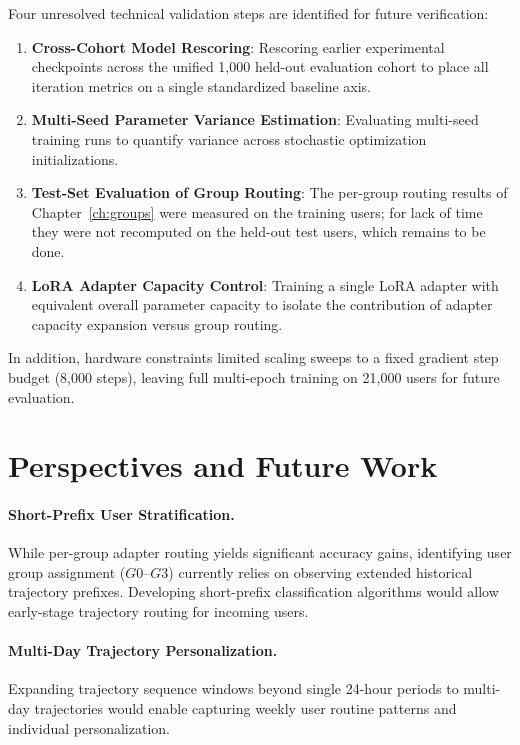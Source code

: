 Four unresolved technical validation steps are identified for future verification:
\begin{enumerate}
    \item \textbf{Cross-Cohort Model Rescoring}: Rescoring earlier experimental checkpoints across the unified 1,000 held-out evaluation cohort to place all iteration metrics on a single standardized baseline axis.
    \item \textbf{Multi-Seed Parameter Variance Estimation}: Evaluating multi-seed training runs to quantify variance across stochastic optimization initializations.
    \item \textbf{Test-Set Evaluation of Group Routing}: The per-group routing results of Chapter~\ref{ch:groups} were measured on the training users; for lack of time they were not recomputed on the held-out test users, which remains to be done.
    \item \textbf{LoRA Adapter Capacity Control}: Training a single LoRA adapter with equivalent overall parameter capacity to isolate the contribution of adapter capacity expansion versus group routing.
\end{enumerate}

In addition, hardware constraints limited scaling sweeps to a fixed gradient step budget (8,000 steps), leaving full multi-epoch training on 21,000 users for future evaluation.

\section{Perspectives and Future Work}

\paragraph{Short-Prefix User Stratification.} While per-group adapter routing yields significant accuracy gains, identifying user group assignment ($G0$--$G3$) currently relies on observing extended historical trajectory prefixes. Developing short-prefix classification algorithms would allow early-stage trajectory routing for incoming users.

\paragraph{Multi-Day Trajectory Personalization.} Expanding trajectory sequence windows beyond single 24-hour periods to multi-day trajectories would enable capturing weekly user routine patterns and individual personalization.

